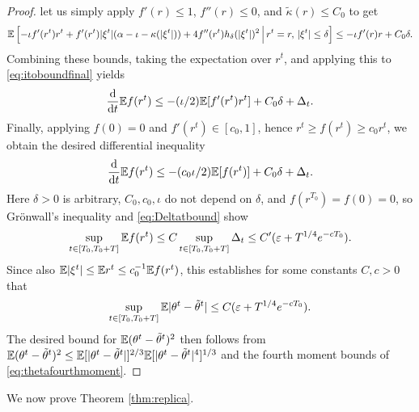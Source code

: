 \begin{proof}
let us simply apply $f'(r) \leq 1$, $f''(r) \leq 0$, and
$\tilde \kappa(r) \leq C_0$ to get
\[\mathbb{E}\left[-\iota f'(r^t)r^t
+f'(r^t)|\xi^t|(\alpha-\iota-\kappa(|\xi^t|))
+4f''(r^t)h_\delta(|\xi^t|)^2 \,\Big|\,r^t=r,\,|\xi^t| \leq \delta \right]
\leq -\iota f'(r)r+C_0\delta.\]
Combining these bounds, taking the expectation over $r^t$, and applying this to
\eqref{eq:itoboundfinal} yields
\[\frac{\mathrm{d}}{\mathrm{d} t}
\mathbb{E} f(r^t)\leq {-}(\iota/2)\mathbb{E}[f'(r^t)r^t]+C_0\delta+\Delta_t.\]
Finally, applying $f(0)=0$ and $f'(r^t) \in [c_0,1]$, hence
$r^t \geq f(r^t) \geq c_0r^t$, we obtain the desired differential inequality
\[\frac{\mathrm{d}}{\mathrm{d} t}
\mathbb{E} f(r^t)\leq {-}(c_0\iota/2)\mathbb{E}[f(r^t)]+C_0\delta+\Delta_t.\]
Here $\delta>0$ is arbitrary, $C_0,c_0,\iota$ do not depend on $\delta$,
and $f(r^{T_0})=f(0)=0$, so Gr\"onwall's inequality and \eqref{eq:Deltatbound}
show
\[\sup_{t \in [T_0,T_0+T]} \mathbb{E} f(r^t) \leq C \sup_{t \in [T_0,T_0+T]} \Delta_t
\leq C'(\varepsilon+T^{1/4}e^{-cT_0}).\]
Since
also $\mathbb{E}|\xi^t| \leq \mathbb{E} r^t \leq c_0^{-1}\mathbb{E} f(r^t)$, this establishes for some
constants $C,c>0$ that
\[\sup_{t \in [T_0,T_0+T]} \mathbb{E}|\theta^t-\tilde \theta^t|
\leq C(\varepsilon+T^{1/4}e^{-cT_0}).\]
The desired bound for $\mathbb{E}(\theta^t-\tilde\theta^t)^2$
then follows from $\mathbb{E}(\theta^t-\tilde\theta^t)^2 \leq
\mathbb{E}[|\theta^t-\tilde\theta^t|]^{2/3}\mathbb{E}[|\theta^t-\tilde\theta^t|^4]^{1/3}$ and
the fourth moment bounds of \eqref{eq:thetafourthmoment}.
\end{proof}

We now prove Theorem \ref{thm:replica}.

